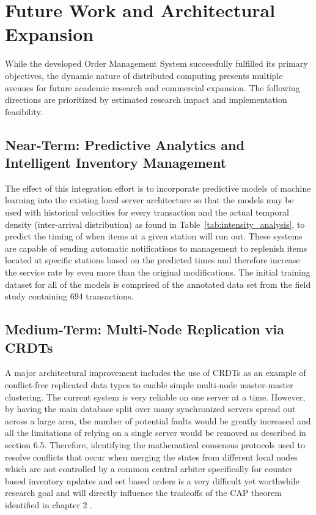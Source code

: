 \section{Future Work and Architectural Expansion}
While the developed Order Management System successfully fulfilled its primary objectives, the dynamic nature of distributed computing presents multiple avenues for future academic research and commercial expansion. The following directions are prioritized by estimated research impact and implementation feasibility.

\subsection{Near-Term: Predictive Analytics and Intelligent Inventory Management}
The effect of this integration effort is to incorporate predictive models of machine learning into the existing local server architecture so that the models may be used with historical velocities for every transaction and the actual temporal density (inter-arrival distribution) as found in Table~\ref{tab:intensity_analysis}, to predict the timing of when items at a given station will run out. These systems are capable of sending automatic notifications to management to replenish items located at specific stations based on the predicted times and therefore increase the service rate by even more than the original modifications. The initial training dataset for all of the models is comprised of the annotated data set from the field study containing 694 transactions.

\subsection{Medium-Term: Multi-Node Replication via CRDTs}
A major architectural improvement includes the use of CRDTs \cite{shapiro2011crdt} as an example of conflict-free replicated data types to enable simple multi-node master-master clustering. The current system is very reliable on one server at a time. However, by having the main database split over many synchronized servers spread out across a large area, the number of potential faults would be greatly increased and all the limitations of relying on a single server would be removed as described in section 6.5. Therefore, identifying the mathematical consensus protocols used to resolve conflicts that occur when merging the states from different local nodes which are not controlled by a common central arbiter specifically for counter based inventory updates and set based orders is a very difficult yet worthwhile research goal and will directly influence the tradeoffs of the CAP theorem identified in chapter 2 \cite{brewer2012cap}.

